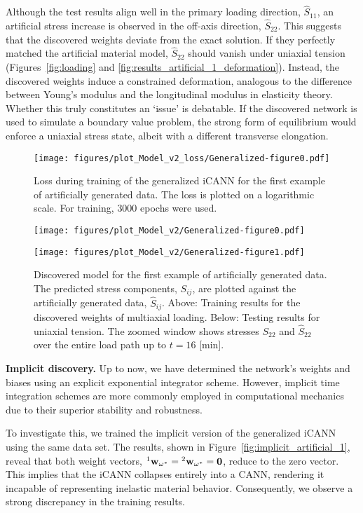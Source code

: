 Although the test results align well in the primary loading direction, \(\hat{S}_{11}\), an artificial stress increase is observed in the off-axis direction, \(\hat{S}_{22}\). 
This suggests that the discovered weights deviate from the exact solution. If they perfectly matched the artificial material model, \(\hat{S}_{22}\) should vanish under uniaxial tension (Figures~\ref{fig:loading} and \ref{fig:results_artificial_1_deformation}). 
Instead, the discovered weights induce a constrained deformation, analogous to the difference between Young's modulus and the longitudinal modulus in elasticity theory.
Whether this truly constitutes an `issue' is debatable. 
If the discovered network is used to simulate a boundary value problem, the strong form of equilibrium would enforce a uniaxial stress state, albeit with a different transverse elongation.
%
\begin{figure}[h]
    \centering
    \texttt{[image: figures/plot\_Model\_v2\_loss/Generalized-figure0.pdf]}
    \caption{Loss during training of the generalized iCANN for the first example of artificially generated data. The loss is plotted on a logarithmic scale. For training, $3000$ epochs were used.}
    \label{fig:loss_artificial_1}
\end{figure}
%
\begin{figure}[h]
    \centering
    \texttt{[image: figures/plot\_Model\_v2/Generalized-figure0.pdf]}

    \texttt{[image: figures/plot\_Model\_v2/Generalized-figure1.pdf]}    
    \caption{Discovered model for the first example of artificially generated data. The predicted stress components, $S_{ij}$, are plotted against the artificially generated data, $\hat{S}_{ij}$. Above: Training results for the discovered weights of multiaxial loading. Below: Testing results for uniaxial tension. The zoomed window shows stresses $S_{22}$ and $\hat{S}_{22}$ over the entire load path up to $t=16$ [min].}
    \label{fig:train_test_artificial_1}
\end{figure}\newline
%

\textbf{Implicit discovery.} Up to now, we have determined the network's weights and biases using an explicit exponential integrator scheme. 
However, implicit time integration schemes are more commonly employed in computational mechanics due to their superior stability and robustness. 

To investigate this, we trained the implicit version of the generalized iCANN using the same data set. 
The results, shown in Figure~\ref{fig:implicit_artificial_1}, reveal that both weight vectors, \(\prescript{1}{}{}\mathbf{w}_{\omega^*} = \prescript{2}{}{}\mathbf{w}_{\omega^*} = \mathbf{0}\), reduce to the zero vector. 
This implies that the iCANN collapses entirely into a CANN, rendering it incapable of representing inelastic material behavior. 
Consequently, we observe a strong discrepancy in the training results.

